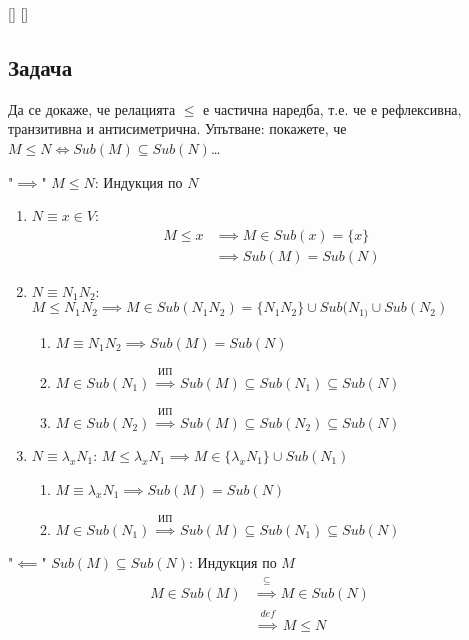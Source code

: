 \documentclass{article}
\newcommand{\overinfo}[2]{
    \stackrel{\substack{#1}}{#2}
}
\newcommand{\Task}[1]{
    \def\taskargs{#1}
    \StrBefore{\taskargs}{,}[\tasksection]
    \StrBehind{\taskargs}{,}[\tasksubsection]
    \setcounter{section}{\fpeval{\tasksection}}
    \setcounter{subsection}{\fpeval{\tasksubsection-1}}
    \subsection{Задача}
}
\begin{document}
\Task{2,12}

Да се докаже, че релацията \(\leq\) е частична наредба, т.е. че е рефлексивна, транзитивна и антисиметрична. Упътване: покажете, че \(M \leq N \Longleftrightarrow Sub\left(M\right) \subseteq Sub\left(N\right)\)\dots

"\(\implies\)" \(M \leq N\): Индукция по \(N\)
\begin{enumerate}
    \item \(N \equiv x \in V\):
        \begin{align*}
            M \leq x &\implies M \in Sub\left(x\right) = \{x\} \\
            &\implies Sub\left(M\right) = Sub\left(N\right)
        \end{align*}
    \item \(N \equiv N_{1}N_{2}\):
        \(M \leq N_{1}N_{2} \implies M \in Sub(N_{1}N_{2}) = \{N_{1}N_{2}\} \cup Sub(N_{1)} \cup Sub(N_{2})\)
        \begin{enumerate}
            \item \(M \equiv N_{1}N_{2} \implies Sub\left(M\right) = Sub\left(N\right)\)
            \item \(M \in Sub(N_{1}) \overinfo{ИП}{\implies} Sub\left(M\right) \subseteq Sub(N_{1}) \subseteq Sub\left(N\right)\)
            \item \(M \in Sub(N_{2}) \overinfo{ИП}{\implies} Sub\left(M\right) \subseteq Sub(N_{2}) \subseteq Sub\left(N\right)\)
        \end{enumerate}
    \item \(N \equiv \lambda_{x}N_{1}\):
        \(M \leq \lambda_{x}N_{1} \implies M \in \{\lambda_{x}N_{1}\} \cup Sub(N_{1})\)
        \begin{enumerate}
            \item \(M \equiv \lambda_{x}N_{1} \implies Sub\left(M\right) = Sub\left(N\right)\)
            \item \(M \in Sub(N_{1}) \overinfo{ИП}{\implies} Sub\left(M\right) \subseteq Sub(N_{1}) \subseteq Sub\left(N\right)\)
        \end{enumerate}
\end{enumerate}

"\(\impliedby\)" \(Sub\left(M\right) \subseteq Sub\left(N\right)\): Индукция по \(M\)
\begin{align*}
    M \in Sub\left(M\right) &\overinfo{\subseteq}{\implies} M \in Sub\left(N\right) \\
    &\overinfo{def}{\implies} M \leq N
\end{align*}
\end{document}
